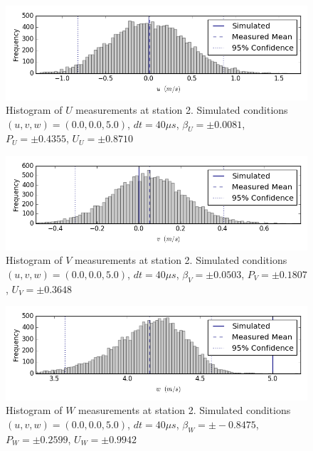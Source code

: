 \begin{figure}[H]
\centering
\includegraphics[width=6in]{figs/Ely_May28th02001/uncertainty_Ely_May28th02001_U}
\caption{Histogram of $U$ measurements at station 2. Simulated conditions $(u,v,w)=(0.0, 0.0, 5.0)$, $dt=40 \mu s$, $\beta_U=\pm 0.0081$, $P_U=\pm 0.4355$, $U_U=\pm 0.8710$}
\label{fig:uncertainty_Ely_May28th02001_U}
\end{figure}


\begin{figure}[H]
\centering
\includegraphics[width=6in]{figs/Ely_May28th02001/uncertainty_Ely_May28th02001_V}
\caption{Histogram of $V$ measurements at station 2. Simulated conditions $(u,v,w)=(0.0, 0.0, 5.0)$, $dt=40 \mu s$, $\beta_V=\pm 0.0503$, $P_V=\pm 0.1807$, $U_V=\pm 0.3648$}
\label{fig:uncertainty_Ely_May28th02001_V}
\end{figure}


\begin{figure}[H]
\centering
\includegraphics[width=6in]{figs/Ely_May28th02001/uncertainty_Ely_May28th02001_W}
\caption{Histogram of $W$ measurements at station 2. Simulated conditions $(u,v,w)=(0.0, 0.0, 5.0)$, $dt=40 \mu s$, $\beta_W=\pm -0.8475$, $P_W=\pm 0.2599$, $U_W=\pm 0.9942$}
\label{fig:uncertainty_Ely_May28th02001_W}
\end{figure}


